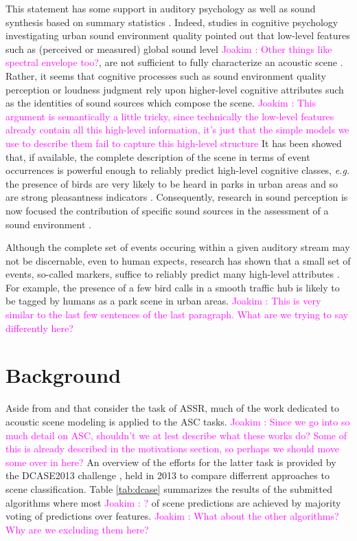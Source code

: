 \documentclass[journal]{IEEEtran}
\newcommand{\ja}[1]{\textcolor{magenta}{Joakim : #1}}
\begin{document}
This statement has some support in auditory psychology as well as sound synthesis based on summary statistics \cite{mcdermott2013summary}. Indeed, studies in cognitive psychology investigating urban sound environment quality pointed out that low-level features such as (perceived or measured) global sound level \ja{Other things like spectral envelope too?}, are not sufficient to fully characterize an acoustic scene \cite{guyot2005urban,kang2006urban}. Rather, it seems that cognitive processes such as sound environment quality perception \cite{dubois2006cognitive} or loudness judgment \cite{kuwano_memory_2003} rely upon higher-level cognitive attributes such as the identities of sound sources which compose the scene. \ja{This argument is semantically a little tricky, since technically the low-level features already contain all this high-level information, it's just that the simple models we use to describe them fail to capture this high-level structure} It has been showed that, if available, the complete description of the scene in terms of event occurrences is powerful enough to reliably predict high-level cognitive classes, \textit{e.g.} the presence of birds are very likely to be heard in parks in urban areas and so are strong pleasantness indicators \cite{lafay:hal-01111782}. Consequently, research in sound perception is now focused the contribution of specific sound sources in the assessment of a sound environment \cite{ricciardi2015sound,lavandier2006contribution}.

Although the complete set of events occuring within a given auditory stream may not be discernable, even to human expects, research has shown that a small set of events, so-called markers, suffice to reliably predict many high-level attributes \cite{lafayPartI}.
For example, the presence of a few bird calls in a smooth traffic hub is likely to be tagged by humans as a park scene in urban areas. \ja{This is very similar to the last few sentences of the last paragraph. What are we trying to say differently here?}

\section{Background} \label{sec:soa}

Aside from \cite{aucouturier2007bag} and \cite{lagrange:hal-01082501} that consider the task of ASSR, much of the work dedicated to acoustic scene modeling is applied to the ASC tasks. \ja{Since we go into so much detail on ASC, shouldn't we at lest describe what these works do? Some of this is already described in the motivations section, so perhaps we should move some over in here?}
An overview of the efforts for the latter task is provided by the DCASE2013 challenge \cite{barchiesi2015acoustic}, held in 2013 to compare differrent approaches to scene classification. Table \ref{tab:dcase} summarizes the results of the submitted algorithms where most \ja{?} of scene predictions are achieved by majority voting of predictions over features. \ja{What about the other algorithms? Why are we excluding them here?}
\end{document}
